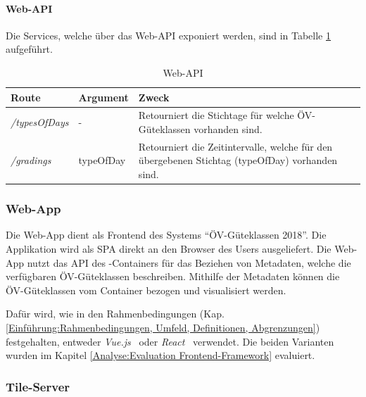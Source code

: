 \paragraph{Web-\ac{API}}
Die Services, welche über das Web-\ac{API} exponiert werden, sind in Tabelle \ref{table:Wep-API} aufgeführt.

\begin{table}[H]
    \centering
    \begin{tabular}[c]{l l p{10.5cm}}
        \toprule
        \textbf{Route}          
                                & \textbf{Argument}
                                & \textbf{Zweck}\\
        \midrule
        \emph{/typesOfDays}
                                & -
                                & Retourniert die Stichtage für welche \acs{ÖV}-Güteklassen vorhanden sind.\\
        \emph{/gradings}        & typeOfDay
                                & Retourniert die Zeitintervalle, welche für den übergebenen Stichtag (typeOfDay) vorhanden sind.\\
        \bottomrule
    \end{tabular}
    \caption{Web-\ac{API}}
    \label{table:Wep-API}
\end{table}


\subsubsection{Web-App}
\label{container:Web-App}

Die Web-App dient als Frontend des Systems "`\acs{ÖV}-Güteklassen 2018"'.
Die Applikation wird als \ac{SPA} direkt an den Browser des Users ausgeliefert.
Die Web-App nutzt das \ac{API} des -Containers für das Beziehen von Metadaten, welche die verfügbaren ÖV-Güteklassen beschreiben.
Mithilfe der Metadaten können die ÖV-Güteklassen vom Container  bezogen und visualisiert werden.

Dafür wird, wie in den Rahmenbedingungen (Kap. \ref{Einführung:Rahmenbedingungen, Umfeld, Definitionen, Abgrenzungen}) festgehalten, entweder \emph{Vue.js}~\cite{vuejs} oder \emph{React}~\cite{react} verwendet.
Die beiden Varianten wurden im Kapitel \ref{Analyse:Evaluation Frontend-Framework} evaluiert.

\subsubsection{Tile-Server}
\label{container:Tile-Server}

